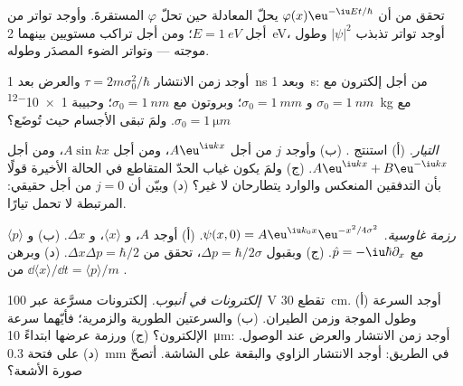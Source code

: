 \begin{exercise}[$\star$]\label{exo:b2:schrodinger-wave-functions:3}
تحقق من أن $\varphi(x)\eu^{-\iu Et/\hbar}$ يحلّ المعادلة حين تحلّ $\varphi$
المستقرةَ. وأوجد تواتر  من أجل $E = \qty{1}{eV}$؛
ومن أجل تراكب مستويين بينهما \qty{2}{eV}، أوجد تواتر تذبذب $|\psi|^2$
وطول موجته --- وتواتر الضوء
المصدَر وطوله.
\end{exercise}

\begin{exercise}[$\star$]\label{exo:b2:schrodinger-wave-functions:4}
أوجد زمن الانتشار $\tau = 2m\sigma_0^2/\hbar$ والعرض بعد \qty{1}{ns} وبعد
\qty{1}{s}: من أجل إلكترون مع $\sigma_0 = \qty{1}{nm}$ و $\sigma_0 = \qty{1}{mm}$؛
وبروتون مع $\sigma_0 = \qty{1}{nm}$؛ وحبيبة \qty{1e-12}{kg} مع
$\sigma_0 = \qty{1}{\micro m}$. ولمَ تبقى الأجسام حيث تُوضَع؟
\end{exercise}

\begin{exercise}[$\star\star$]\label{exo:b2:schrodinger-wave-functions:5}
\emph{التيار.} (أ) استنتج . (ب) وأوجد $j$ من أجل
$A\eu^{\iu kx}$، ومن أجل $A\sin kx$، ومن أجل $A\eu^{\iu kx} + B\eu^{-\iu kx}$. (ج) ولمَ يكون
غياب الحدّ المتقاطع في الحالة الأخيرة قولًا بأن
التدفقين المنعكس والوارد يتطارحان لا غير؟ (د) وبيّن أن $j = 0$ من أجل  حقيقي:  المرتبطة لا تحمل تيارًا.
\end{exercise}

\begin{exercise}[$\star\star$]\label{exo:b2:schrodinger-wave-functions:6}
\emph{رزمة غاوسية.} $\psi(x,0) = A\eu^{\iu k_0x}\eu^{-x^2/4\sigma^2}$. (أ)
أوجد $A$، و $\langle x\rangle$، و $\Delta x$. (ب) و $\langle p\rangle$ مع $\hat p =
-\iu\hbar\partial_x$. (ج) وبقبول $\Delta p = \hbar/2\sigma$، تحقق من
$\Delta x\Delta p = \hbar/2$. (د) وبرهن $\dd\langle x\rangle/\dd t = \langle
p\rangle/m$ من .
\end{exercise}

\begin{exercise}[$\star\star$]\label{exo:b2:schrodinger-wave-functions:7}
\emph{إلكترونات في أنبوب.} إلكترونات مسرَّعة عبر \qty{100}{V}
تقطع \qty{30}{cm}. (أ) أوجد السرعة وطول الموجة وزمن الطيران. (ب) والسرعتين
الطورية والزمرية؛ فأيّهما سرعة الإلكترون؟ (ج) ورزمة عرضها ابتداءً
\qty{10}{\micro m}: أوجد زمن الانتشار والعرض عند الوصول. (د) 
على فتحة \qty{0.3}{mm} في الطريق: أوجد الانتشار الزاوي والبقعة على
الشاشة. أتصحّ صورة الأشعة؟
\end{exercise}

